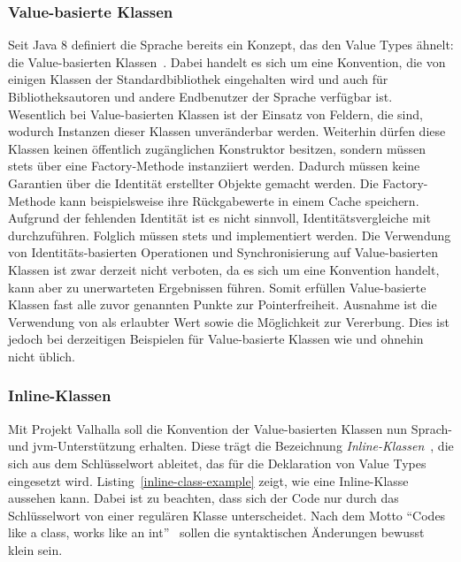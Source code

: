 \subsubsection{Value-basierte Klassen}

Seit Java 8 definiert die Sprache bereits ein Konzept, das den Value Types ähnelt: die Value-basierten Klassen~\cite{value-based-classes}.
Dabei handelt es sich um eine Konvention, die von einigen Klassen der Standardbibliothek eingehalten wird und auch für Bibliotheksautoren und andere Endbenutzer der Sprache verfügbar ist.
Wesentlich bei Value-basierten Klassen ist der Einsatz von Feldern, die  sind, wodurch Instanzen dieser Klassen unveränderbar werden.
Weiterhin dürfen diese Klassen keinen öffentlich zugänglichen Konstruktor besitzen, sondern müssen stets über eine Factory-Methode instanziiert werden.
Dadurch müssen keine Garantien über die Identität erstellter Objekte gemacht werden.
Die Factory-Methode kann beispielsweise ihre Rückgabewerte in einem Cache speichern.
Aufgrund der fehlenden Identität ist es nicht sinnvoll, Identitätsvergleiche mit \code{==} durchzuführen.
Folglich müssen stets  und  implementiert werden.
Die Verwendung von Identitäts-basierten Operationen und Synchronisierung auf Value-basierten Klassen ist zwar derzeit nicht verboten, da es sich um eine Konvention handelt, kann aber zu unerwarteten Ergebnissen führen.
Somit erfüllen Value-basierte Klassen fast alle zuvor genannten Punkte zur Pointerfreiheit.
Ausnahme ist die Verwendung von  als erlaubter Wert sowie die Möglichkeit zur Vererbung.
Dies ist jedoch bei derzeitigen Beispielen für Value-basierte Klassen wie  und  ohnehin nicht üblich.

\subsubsection{Inline-Klassen}

Mit Projekt Valhalla soll die Konvention der Value-basierten Klassen nun Sprach- und \ac{jvm}-Unterstützung erhalten.
Diese trägt die Bezeichnung \emph{Inline-Klassen}~\cite{object-model}, die sich aus dem Schlüsselwort  ableitet, das für die Deklaration von Value Types eingesetzt wird.
Listing~\ref{inline-class-example} zeigt, wie eine Inline-Klasse aussehen kann.
Dabei ist zu beachten, dass sich der Code nur durch das Schlüsselwort  von einer regulären Klasse unterscheidet.
Nach dem Motto ``Codes like a class, works like an int''~\cite{object-model} sollen die syntaktischen Änderungen bewusst klein sein.

